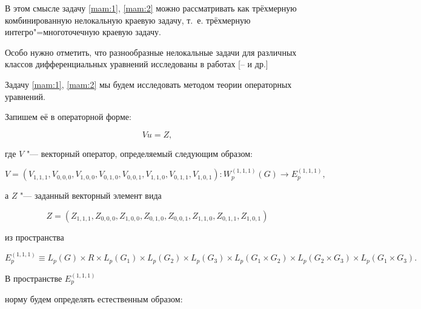 В этом смысле задачу \eqref{mam:1}, \eqref{mam:2} можно рассматривать как трёхмерную комбинированную нелокальную краевую задачу, т.~е. трёхмерную интегро"=многоточечную   краевую задачу. 

Особо нужно отметить, что разнообразные нелокальные задачи для различных классов дифференциальных уравнений исследованы в работах [-- и др.]







Задачу \eqref{mam:1}, \eqref{mam:2} мы будем исследовать методом теории операторных уравнений. 

Запишем её в операторной форме: 

\begin{equation} \label{mam:3}

Vu=Z,

\end{equation}

где $V$ "--- векторный оператор, определяемый следующим образом:

$$V=(V_{1, 1, 1},V_{0, 0, 0},V_{1, 0, 0},V_{0, 1, 0},V_{0, 0, 1},V_{1, 1, 0},V_{0, 1, 1},V_{1, 0, 1}) :

W_{p}^{(1, 1, 1)}(G)\to E_{p}^{(1, 1, 1)},$$

а $Z$ "--- заданный векторный элемент вида

$$

Z=\left(Z_{1, 1, 1},Z_{0, 0, 0},Z_{1, 0, 0},Z_{0, 1, 0},Z_{0, 0, 1},Z_{1, 1, 0},Z_{0, 1, 1},Z_{1, 0, 1}\right)

$$

из пространства

$

E_{p}^{(1, 1, 1)}\equiv L_{p}(G)\times R\times L_{p}(G_1 )\times

L_{p}(G_2 )\times L_{p}(G_3 )%

\times {L_{p}(G_1 \times G_2 )}\times

L_{p}(G_2 \times G_3 )\times L_{p}(G_1 \times G_3 ).

$



В пространстве $E_{p}^{(1, 1, 1)}$

норму будем определять естественным образом:

